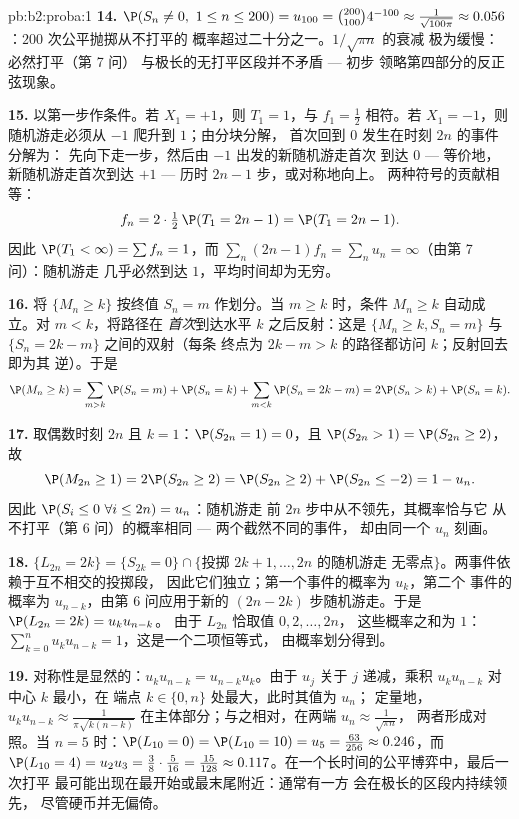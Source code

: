 \begin{solution}{pb:b2:proba:1}
\textbf{14.} $\P(S_n \neq 0,\ 1 \leq n \leq 200) = u_{100} =
\binom{200}{100}4^{-100} \approx \frac1{\sqrt{100\pi}}
\approx 0.056$：$200$ 次公平抛掷从不打平的
概率超过二十分之一。$1/\sqrt{\pi n}$ 的衰减
极为缓慢：必然打平（第 7 问）
与极长的无打平区段并不矛盾 --- 初步
领略第四部分的反正弦现象。

\textbf{15.} 以第一步作条件。若 $X_1 = +1$，则
$T_1 = 1$，与 $f_1 = \frac12$ 相符。若 $X_1 = -1$，则
随机游走必须从 $-1$ 爬升到 $1$；由分块分解，
首次回到 $0$ 发生在时刻 $2n$ 的事件分解为：
先向下走一步，然后由 $-1$ 出发的新随机游走首次
到达 $0$ --- 等价地，新随机游走首次到达
$+1$ --- 历时 $2n - 1$ 步，或对称地向上。
两种符号的贡献相等：
\[
f_n = 2\cdot\tfrac12\,\P(T_1 = 2n - 1) = \P(T_1 = 2n-1) .
\]
因此 $\P(T_1 < \infty) = \sum f_n = 1$，而 $\sum_n(2n -
1)f_n = \sum_n u_n = \infty$（由第 7 问）：随机游走
几乎必然到达 $1$，平均时间却为无穷。

\textbf{16.} 将 $\{M_n \geq k\}$ 按终值
$S_n = m$ 作划分。当 $m \geq k$ 时，条件 $M_n \geq k$
自动成立。对 $m < k$，将路径在
\emph{首次}到达水平 $k$ 之后反射：这是
$\{M_n \geq k, S_n = m\}$ 与 $\{S_n = 2k - m\}$ 之间的双射（每条
终点为 $2k - m > k$ 的路径都访问 $k$；反射回去即为其
逆）。于是
\[
\P(M_n \geq k)
= \sum_{m > k}\P(S_n = m) + \P(S_n = k)
+ \sum_{m < k}\P(S_n = 2k - m)
= 2\P(S_n > k) + \P(S_n = k).
\]

\textbf{17.} 取偶数时刻 $2n$ 且 $k = 1$：$\P(S_{2n} = 1)
= 0$，且 $\P(S_{2n} > 1) = \P(S_{2n} \geq 2)$，故
\[
\P(M_{2n} \geq 1) = 2\P(S_{2n} \geq 2)
= \P(S_{2n} \geq 2) + \P(S_{2n} \leq -2)
= 1 - u_n .
\]
因此 $\P(S_i \leq 0\ \forall i \leq 2n) = u_n$：随机游走
前 $2n$ 步中从不领先，其概率恰与它
从不打平（第 6 问）的概率相同 --- 两个截然不同的事件，
却由同一个 $u_n$ 刻画。

\textbf{18.} $\{L_{2n} = 2k\} = \{S_{2k} = 0\} \cap
\{\text{投掷 } 2k+1, \dots, 2n \text{ 的随机游走
无零点}\}$。两事件依赖于互不相交的投掷段，
因此它们独立；第一个事件的概率为 $u_k$，第二个
事件的概率为 $u_{n-k}$，由第 6 问应用于新的
$(2n-2k)$ 步随机游走。于是 $\P(L_{2n} = 2k) = u_ku_{n-k}$。
由于 $L_{2n}$ 恰取值 $0, 2, \dots, 2n$，
这些概率之和为 $1$：
$\sum_{k=0}^nu_ku_{n-k} = 1$，这是一个二项恒等式，
由概率划分得到。

\textbf{19.} 对称性是显然的：$u_ku_{n-k} =
u_{n-k}u_k$。由于 $u_j$ 关于 $j$ 递减，乘积
$u_ku_{n-k}$ 对中心 $k$ 最小，在
端点 $k \in \{0, n\}$ 处最大，此时其值为 $u_n$；
定量地，$u_ku_{n-k} \approx \frac1{\pi\sqrt{k(n-k)}}$
在主体部分；与之相对，在两端 $u_n \approx \frac1{\sqrt{\pi n}}$，
两者形成对照。当 $n = 5$ 时：$\P(L_{10} = 0) = \P(L_{10} = 10) =
u_5 = \frac{63}{256} \approx 0.246$，而 $\P(L_{10} = 4) =
u_2u_3 = \frac38\cdot\frac5{16} = \frac{15}{128} \approx
0.117$。在一个长时间的公平博弈中，最后一次打平
最可能出现在最开始或最末尾附近：通常有一方
会在极长的区段内持续领先，
尽管硬币并无偏倚。


\end{solution}

